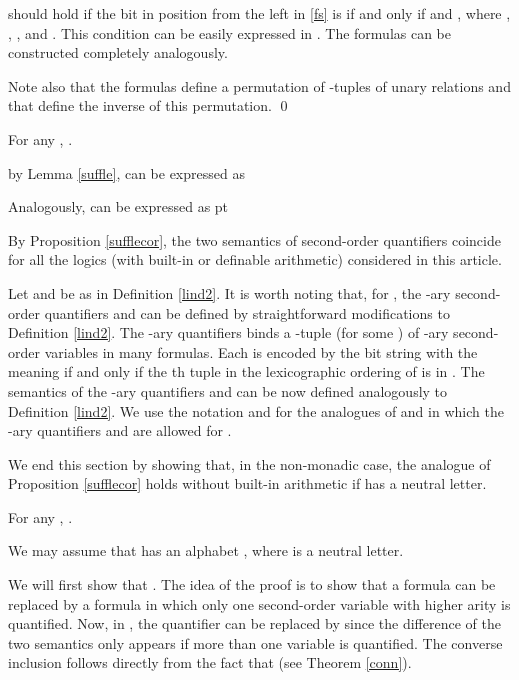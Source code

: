 \documentclass{LMCS}
\begin{document}
should hold if the bit in position  from the left in \eqref{fs}  is  if and only if   and , where
, , , and  . This condition can be easily expressed in . The formulas   can be constructed completely analogously. 

Note also that the formulas   define a  permutation of -tuples of unary relations  and that   define the  inverse of this permutation.
\qed


\begin{prop}\label{sufflecor}For any , .
\end{prop}
\proof
 by Lemma \ref{suffle},   can be expressed as 

Analogously,  can be expressed as  
 pt

\noindent By Proposition \ref{sufflecor}, the two semantics of
second-order quantifiers coincide for all the logics (with built-in or
definable arithmetic) considered in this article.

\begin{rem}\label{mary} Let  and  be as in Definition \ref{lind2}. It is worth noting that, for , the -ary second-order quantifiers  and  can be defined  by  straightforward modifications to Definition \ref{lind2}. The -ary quantifiers binds  a -tuple   (for some ) of -ary second-order variables in  many formulas.  Each  is encoded by the bit string  with the meaning  if and only if  the th tuple in the lexicographic ordering of  is in . The semantics of the -ary quantifiers  and  can be now defined analogously to Definition \ref{lind2}.
We use the notation 
   and   for the analogues of   and  in which the -ary quantifiers  and  are allowed for  .
\end{rem}


We end this section by showing that, in the non-monadic case, the analogue of Proposition \ref{sufflecor} holds without built-in arithmetic if  has a neutral letter.  
\begin{prop}\label{sufflemary} For any , 
  .
\end{prop}
\proof We may assume that  has an  alphabet , where  is a neutral letter. 

We will first show that . The idea of the proof is to show that a formula  can be replaced by 
a formula  in which only one second-order variable with higher arity is quantified. Now, in  , the quantifier  can be replaced by  since the difference of the two semantics only appears if more than one variable is quantified. The converse inclusion follows directly from the fact that  (see Theorem \ref{conn}).  
\end{document}
